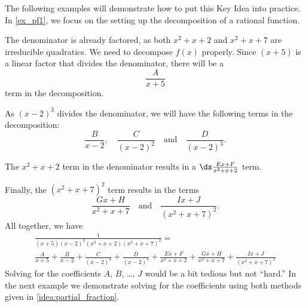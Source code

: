 The following examples will demonstrate how to put this Key Idea into practice. In \autoref{ex_pf1}, we focus on the setting up the decomposition of a rational function.

{The denominator is already factored, as both $x^2+x+2$ and $x^2+x+7$ are irreducible quadratics. We need to decompose $f(x)$ properly. Since $(x+5)$ is a linear factor that divides the denominator, there will be a
\[\frac{A}{x+5}\]
term in the decomposition.

As $(x-2)^3$ divides the denominator, we will have the following terms in the decomposition:
$$\frac{B}{x-2},\quad \frac{C}{(x-2)^2}\quad \text{and}\quad \frac{D}{(x-2)^3}.$$

The $x^2+x+2$ term in the denominator results in a $\ds\frac{Ex+F}{x^2+x+2}$ term.

Finally, the $(x^2+x+7)^2$ term results in the terms $$\frac{Gx+H}{x^2+x+7}\quad \text{and}\quad \frac{Ix+J}{(x^2+x+7)^2}.$$
All together, we have 
\begin{multline*}
	\frac{1}{(x+5)(x-2)^3(x^2+x+2)(x^2+x+7)^2}= \\
	\frac{A}{x+5} + \frac{B}{x-2}+ \frac{C}{(x-2)^2}+\frac{D}{(x-2)^3}+
	\frac{Ex+F}{x^2+x+2}+\frac{Gx+H}{x^2+x+7}+\frac{Ix+J}{(x^2+x+7)^2}
\end{multline*}
Solving for the coefficients $A$, $B$, \ldots, $J$ would be a bit tedious but not ``hard.''  In the next example we demonstrate solving for the coefficients using both methods given in \autoref{idea:partial_fraction}.}


